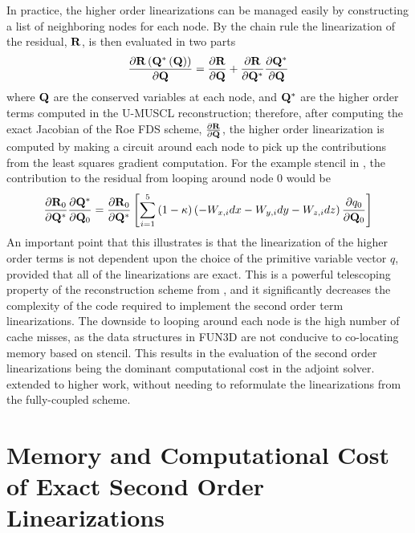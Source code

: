 In practice, the higher order linearizations can be managed easily by
constructing a list of neighboring nodes for each node.  By the chain rule the
linearization of the residual, $\mathbf R$, is then evaluated in two parts
\begin{equation}
  \frac{\partial \mathbf R\left(\mathbf Q^*\left( \mathbf Q \right) \right)}{\partial \mathbf Q} = 
  \frac{\partial \mathbf R}{\partial \mathbf Q} + \frac{\partial \mathbf R}{\partial \mathbf Q^{*}}\frac{\partial \mathbf Q^*}{\partial \mathbf Q}
  \label{residual-high-low}
\end{equation}
where $\mathbf Q$ are the conserved variables at each node, and $\mathbf Q^*$ are the higher
order terms computed in the U-MUSCL reconstruction; therefore, after computing
the exact Jacobian of the Roe FDS scheme, $\frac{\partial \mathbf R}{\partial \mathbf Q}$, the higher order
linearization is computed by making a circuit around each node to pick up the
contributions from the least squares gradient computation.  For the example
stencil in , the contribution to the residual from
looping around node 0 would be
\begin{equation}
  \frac{\partial \mathbf R_0}{\partial \mathbf Q^*}\frac{\partial \mathbf Q^*}{\partial \mathbf Q_0} = \frac{\partial \mathbf R_0}{\partial \mathbf Q^*} \left[\sum_{i=1}^5{(1-\kappa)
  \left( -W_{x,i}dx - W_{y,i}dy - W_{z,i}dz \right) \frac{\partial q_0}{\partial \mathbf Q_0}}\right]
  \label{ho-linearization}
\end{equation}
An important point that this illustrates is that the linearization of the higher
order terms is not dependent upon the choice of the primitive variable vector
$q$, provided that all of the linearizations are exact.  This is a powerful
telescoping property of the reconstruction scheme from
, and it significantly decreases the
complexity of the code required to implement the second order term
linearizations.  The downside to looping around each node is the high number of
cache misses, as the data structures in FUN3D are not conducive to co-locating
memory based on stencil.  This results in the evaluation of the second order
linearizations being the dominant computational cost in the adjoint solver.
extended to higher work, without
needing to reformulate the linearizations from the fully-coupled scheme.

\section{Memory and Computational Cost of Exact Second Order Linearizations}
\label{sec:2nd-order-mem-cost}

